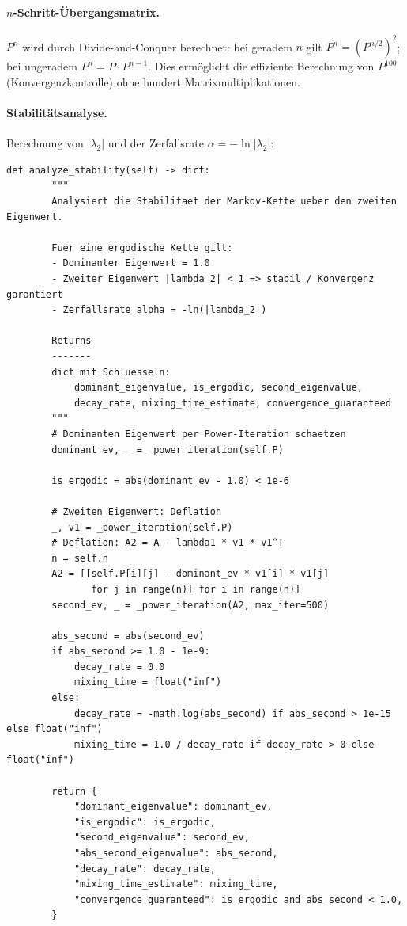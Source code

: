 ﻿\documentclass[a4paper,12pt]{report}
\theoremstyle{definition}
\begin{document}
\paragraph{$n$-Schritt-Übergangsmatrix.}
$P^n$ wird durch Divide-and-Conquer berechnet: bei geradem $n$ gilt
$P^n = (P^{n/2})^2$; bei ungeradem $P^n = P \cdot P^{n-1}$. Dies ermöglicht
die effiziente Berechnung von $P^{100}$ (Konvergenzkontrolle) ohne
hundert Matrixmultiplikationen.

\paragraph{Stabilitätsanalyse.}
Berechnung von $|\lambda_2|$ und der Zerfallsrate $\alpha = -\ln|\lambda_2|$:

\begin{lstlisting}[style=python, caption={Stabilitätsanalyse: Zerfallsrate und Mixing-Zeit}, label=lst:stability-impl]
def analyze_stability(self) -> dict:
        """
        Analysiert die Stabilitaet der Markov-Kette ueber den zweiten Eigenwert.

        Fuer eine ergodische Kette gilt:
        - Dominanter Eigenwert = 1.0
        - Zweiter Eigenwert |lambda_2| < 1 => stabil / Konvergenz garantiert
        - Zerfallsrate alpha = -ln(|lambda_2|)

        Returns
        -------
        dict mit Schluesseln:
            dominant_eigenvalue, is_ergodic, second_eigenvalue,
            decay_rate, mixing_time_estimate, convergence_guaranteed
        """
        # Dominanten Eigenwert per Power-Iteration schaetzen
        dominant_ev, _ = _power_iteration(self.P)

        is_ergodic = abs(dominant_ev - 1.0) < 1e-6

        # Zweiten Eigenwert: Deflation
        _, v1 = _power_iteration(self.P)
        # Deflation: A2 = A - lambda1 * v1 * v1^T
        n = self.n
        A2 = [[self.P[i][j] - dominant_ev * v1[i] * v1[j]
               for j in range(n)] for i in range(n)]
        second_ev, _ = _power_iteration(A2, max_iter=500)

        abs_second = abs(second_ev)
        if abs_second >= 1.0 - 1e-9:
            decay_rate = 0.0
            mixing_time = float("inf")
        else:
            decay_rate = -math.log(abs_second) if abs_second > 1e-15 else float("inf")
            mixing_time = 1.0 / decay_rate if decay_rate > 0 else float("inf")

        return {
            "dominant_eigenvalue": dominant_ev,
            "is_ergodic": is_ergodic,
            "second_eigenvalue": second_ev,
            "abs_second_eigenvalue": abs_second,
            "decay_rate": decay_rate,
            "mixing_time_estimate": mixing_time,
            "convergence_guaranteed": is_ergodic and abs_second < 1.0,
        }
\end{lstlisting}
\end{document}

